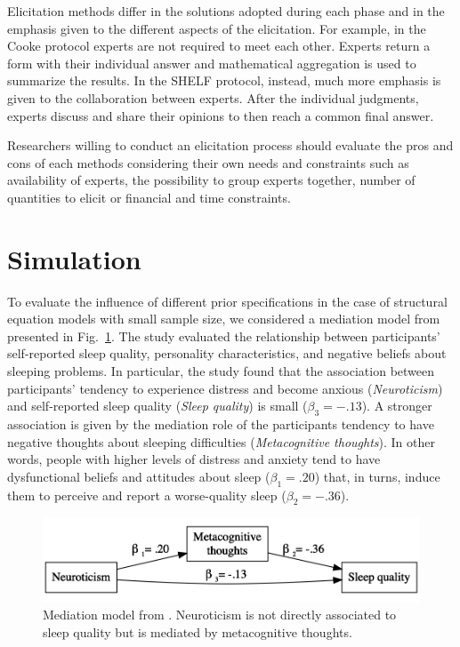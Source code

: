 \documentclass[graybox]{svmult}
\begin{document}
Elicitation methods differ in the solutions adopted during each phase and in the emphasis given to the different aspects of the elicitation. For example, in the Cooke protocol experts are not required to meet each other. Experts return a form with their individual answer and mathematical aggregation is used to summarize the results. In the SHELF protocol, instead, much more emphasis is given to the collaboration between experts. After the  individual judgments, experts discuss and share their opinions to then reach a common final answer.

Researchers willing to conduct an elicitation process should evaluate the pros and cons of each methods considering their own needs and constraints such as availability of experts, the possibility to group experts together, number of quantities to elicit or financial and time constraints.

\section{Simulation}
\label{sec:simulation}

To evaluate the influence of different prior specifications in the case of structural equation models with small sample size, we considered a mediation model from \cite{sellaPersonalityTraitsSleep2020}  presented in Fig.~\ref{fig:example_model}. The study evaluated the relationship between participants' self-reported sleep quality, personality characteristics, and negative beliefs about sleeping problems. In particular, the study found that the association between participants' tendency to experience distress and become anxious (\emph{Neuroticism}) and self-reported sleep quality (\emph{Sleep quality}) is small ($\beta_3=-.13$).  A stronger association is given  by the mediation role of the participants tendency to have negative thoughts about sleeping difficulties (\emph{Metacognitive thoughts}). In other words, people with higher levels of distress and anxiety tend to have dysfunctional beliefs and attitudes about sleep ($\beta_1=.20$) that, in turns, induce them to perceive and report a worse-quality sleep ($\beta_2=-.36$).

\begin{figure}[b]
	\sidecaption
	\includegraphics[width = .64\textwidth]{figure/Plot_example_model}
	\caption{Mediation model from \cite{sellaPersonalityTraitsSleep2020}. Neuroticism is not directly associated to sleep quality but is mediated by metacognitive thoughts.}
	\label{fig:example_model}
\end{figure}
\end{document}
